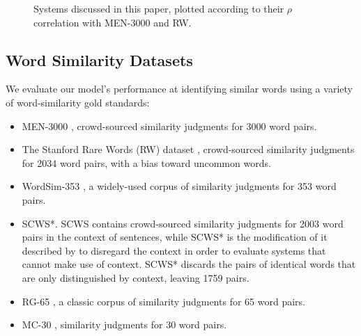 \documentclass[letterpaper]{article}
\begin{document}
\begin{figure}
\caption{
    Systems discussed in this paper, plotted according to their $\rho$
    correlation with MEN-3000 and RW.
}
\label{compare-graph}
\end{figure}

\subsection{Word Similarity Datasets}

We evaluate our model's performance at identifying similar words using a
variety of word-similarity gold standards:

\begin{itemize}
\item MEN-3000 \cite{bruni2014men}, crowd-sourced similarity judgments for 3000
    word pairs.
\item The Stanford Rare Words (RW) dataset \cite{luong2013rw}, crowd-sourced
    similarity judgments for 2034 word pairs, with a bias toward uncommon words.
\item WordSim-353 \cite{finkelstein2001ws}, a widely-used corpus of similarity
    judgments for 353 word pairs.
\item SCWS*. SCWS \cite{huang2012scws} contains crowd-sourced similarity
    judgments for 2003 word pairs in the context of sentences, while SCWS* is
    the modification of it described by 
    to disregard the context in order to evaluate
    systems that cannot make use of context. SCWS* discards the pairs of
    identical words that are only distinguished by context, leaving 1759 pairs.
\item RG-65 \cite{rubenstein1965rg}, a classic corpus of similarity judgments
    for 65 word pairs.
\item MC-30 \cite{miller1991mc}, similarity judgments for 30 word pairs.
\end{itemize}
\end{document}
